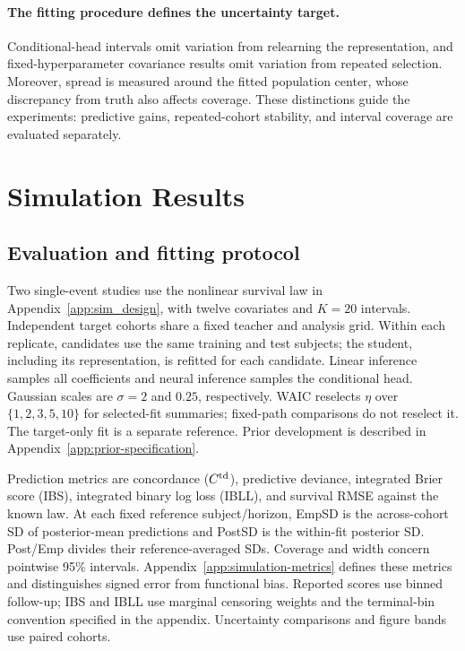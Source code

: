\documentclass{article} %
\begin{document}
\paragraph{The fitting procedure defines the uncertainty target.}
Conditional-head intervals omit variation from relearning the representation, and fixed-hyperparameter covariance results omit variation from repeated selection. Moreover, spread is measured around the fitted population center, whose discrepancy from truth also affects coverage. These distinctions guide the experiments: predictive gains, repeated-cohort stability, and interval coverage are evaluated separately.

\section{Simulation Results}
\label{sec:experiments}

\subsection{Evaluation and fitting protocol}
\label{sec:exp_protocol}
Two single-event studies use the nonlinear survival law in Appendix~\ref{app:sim_design}, with twelve covariates and $K=20$ intervals. Independent target cohorts share a fixed teacher and analysis grid. Within each replicate, candidates use the same training and test subjects; the student, including its representation, is refitted for each candidate. Linear inference samples all coefficients and neural inference samples the conditional head. Gaussian scales are $\sigma=2$ and $0.25$, respectively. WAIC reselects $\eta$ over $\{1,2,3,5,10\}$ for selected-fit summaries; fixed-path comparisons do not reselect it. The target-only fit is a separate reference. Prior development is described in Appendix~\ref{app:prior-specification}.

Prediction metrics are concordance ($C^{\rm td}$), predictive deviance, integrated Brier score (IBS), integrated binary log loss (IBLL), and survival RMSE against the known law. At each fixed reference subject/horizon, EmpSD is the across-cohort SD of posterior-mean predictions and PostSD is the within-fit posterior SD. Post/Emp divides their reference-averaged SDs. Coverage and width concern pointwise 95\% intervals. Appendix~\ref{app:simulation-metrics} defines these metrics and distinguishes signed error from functional bias. Reported scores use binned follow-up; IBS and IBLL use marginal censoring weights and the terminal-bin convention specified in the appendix. Uncertainty comparisons and figure bands use paired cohorts.
\end{document}
